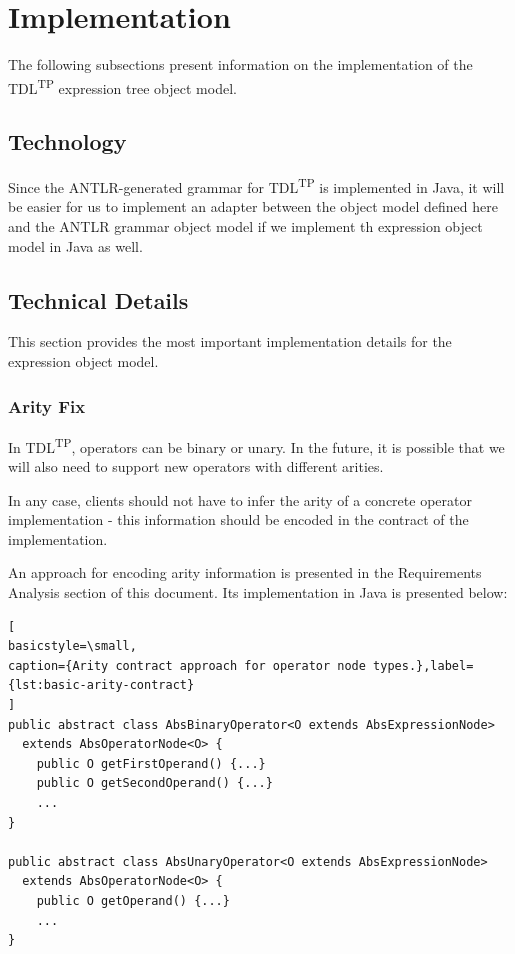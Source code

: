 \documentclass[12pt,oneside,a4paper,notitlepage]{report}
\begin{document}
	\section*{Implementation}
	\par The following subsections present information on the implementation of the TDL\textsuperscript{TP} expression tree object model.

	\subsection*{Technology}
	\par Since the ANTLR-generated grammar for TDL\textsuperscript{TP} is implemented in Java, it will be easier for us to implement an adapter between the object model defined here and the ANTLR grammar object model if we implement th expression object model in Java as well.

	\subsection*{Technical Details}
	\par This section provides the most important implementation details for the expression object model.

	\subsubsection*{Arity Fix}
	\par In TDL\textsuperscript{TP}, operators can be binary or unary. In the future, it is possible that we will also need to support new operators with different arities.

	\bigskip

	\par In any case, clients should not have to infer the arity of a concrete operator implementation - this information should be encoded in the contract of the implementation.

	\newpage

	\par An approach for encoding arity information is presented in the Requirements Analysis section of this document. Its implementation in Java is presented below:

	\begin{lstlisting}[
basicstyle=\small,
caption={Arity contract approach for operator node types.},label={lst:basic-arity-contract}
]
public abstract class AbsBinaryOperator<O extends AbsExpressionNode>
  extends AbsOperatorNode<O> {
	public O getFirstOperand() {...}
	public O getSecondOperand() {...}
	...
}

public abstract class AbsUnaryOperator<O extends AbsExpressionNode>
  extends AbsOperatorNode<O> {
	public O getOperand() {...}
	...
}
	\end{lstlisting}
\end{document}

